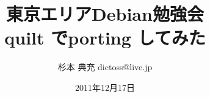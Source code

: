 




\documentclass[cjk,dvipdfmx,12pt]{beamer}
\usepackage{monthlypresentation}



\title{東京エリアDebian勉強会 \\quilt でporting してみた}
\subtitle{}
\author{杉本 典充 dictoss@live.jp}
\date{2011年12月17日}




